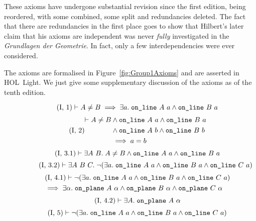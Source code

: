 These axioms have undergone substantial revision since the first edition, being reordered, with some combined, some split and redundancies deleted. The fact that there are redundancies in the first place goes to show that Hilbert's later claim that his axioms are independent was never \emph{fully} investigated in the \emph{Grundlagen der Geometrie}. In fact, only a few interdependencies were ever considered.

The axioms are formalised in Figure~\ref{fig:Group1Axioms} and are asserted in HOL~Light. We just give some supplementary discussion of the axioms as of the tenth edition.

\begin{figure}
\begin{equation}\label{eq:g11}
  \tag{I,~1}
    \vdash A \neq B \implies \exists a.\; \texttt{on\_line}\ A\ a \wedge \texttt{on\_line}\ B\ a
\end{equation}
\begin{equation}\label{eq:g12}
  \tag{I,~2}
  \begin{split}
    \vdash A \neq B &\wedge \texttt{on\_line}\ A\ a \wedge \texttt{on\_line}\ B\ a\\
    &\wedge \texttt{on\_line}\ A\ b \wedge \texttt{on\_line}\ B\ b\\
    &\implies a = b
  \end{split}
\end{equation}
\begin{equation}\label{eq:g13a}
  \tag{I,~3.1}
  \vdash \exists A\ B.\; A \neq B \wedge \texttt{on\_line}\ A\ a \wedge \texttt{on\_line}\ B\ a
\end{equation}
\begin{equation}\label{eq:g13b}  \tag{I,~3.2}
  \vdash\exists A\ B\ C.\; \neg(\exists a.\; \texttt{on\_line}\ A\ a\wedge \texttt{on\_line}\ B\ a\wedge \texttt{on\_line}\ C\ a)
\end{equation}
\begin{multline}\label{eq:g14a}
  \tag{I,~4.1}
  \vdash\neg(\exists a.\; \texttt{on\_line}\ A\ a\wedge \texttt{on\_line}\ B\ a\wedge \texttt{on\_line}\ C\ a)\\\quad \implies \exists \alpha.\; \texttt{on\_plane}\ A\ \alpha \wedge \texttt{on\_plane}\ B\ \alpha \wedge \texttt{on\_plane}\ C\ \alpha
\end{multline}
\begin{equation}\label{eq:g14b}
  \tag{I,~4.2}
  \vdash\exists A.\; \texttt{on\_plane}\ A\ \alpha
\end{equation}
\begin{equation}\label{eq:g15}
  \tag{I,~5}
  \begin{split}
    &\vdash\Triangle{a}{A}{B}{C}\\

\end{split}
\end{equation}
\end{figure}

